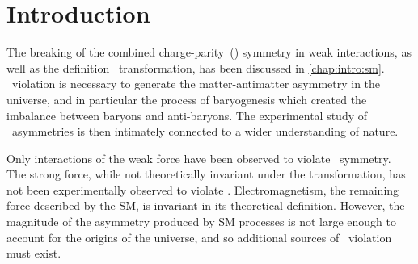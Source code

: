 \chapter{Introduction}
\label{chap:cpv:introduction}

The breaking of the combined charge-parity~(\CP) symmetry in weak interactions, 
as well as the definition \CP\ transformation, has been discussed in 
\cref{chap:intro:sm}.
\CP\ violation is necessary to generate the matter-antimatter asymmetry in the 
universe, and in particular the process of baryogenesis which created the 
imbalance between baryons and anti-baryons.
The experimental study of \CP\ asymmetries is then intimately connected to a 
wider understanding of nature.

Only interactions of the weak force have been observed to violate \CP\ 
symmetry.
The strong force, while not theoretically invariant under the \CP 
transformation, has not been experimentally observed to violate \CP\@.
Electromagnetism, the remaining force described by the \acl{SM}, is invariant 
in its theoretical definition.
However, the magnitude of the asymmetry produced by \ac{SM} processes is not 
large enough to account for the origins of the universe, and so additional 
sources of \CP\ violation must exist.
